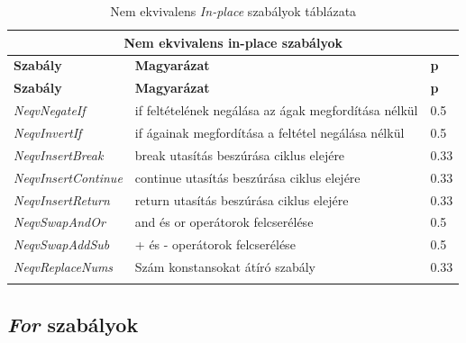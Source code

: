 \begin{center}
	\begin{longtable}{ | p{} | p{} | p{} | }
		\hline
		\multicolumn{3}{|c|}{\textbf{Nem ekvivalens in-place szabályok}}
		\\ \hline
		
		\textbf{Szabály} & \textbf{Magyarázat} & \textbf{p}
		\\ \hline \hline
		\endfirsthead %
		
		\hline
		\textbf{Szabály} & \textbf{Magyarázat} & \textbf{p}
		\\ \hline \hline
		\endhead %
		
		\hline
		\endfoot %
		
		\endlastfoot %
		
		\emph{NeqvNegateIf}
		& if feltételének negálása az ágak megfordítása nélkül
		& 0.5
		\\ \hline

		\emph{NeqvInvertIf}
		& if ágainak megfordítása a feltétel negálása nélkül
		& 0.5
		\\ \hline

		\emph{NeqvInsertBreak}
		& break utasítás beszúrása ciklus elejére
		& 0.33
		\\ \hline

		\emph{NeqvInsertContinue}
		& continue utasítás beszúrása ciklus elejére
		& 0.33
		\\ \hline

		\emph{NeqvInsertReturn}
		& return utasítás beszúrása ciklus elejére
		& 0.33
		\\ \hline
		
		\emph{NeqvSwapAndOr}
		& and és or operátorok felcserélése
		& 0.5
		\\ \hline

		\emph{NeqvSwapAddSub}
		& + és - operátorok felcserélése
		& 0.5
		\\ \hline

		\emph{NeqvReplaceNums}
		& Szám konstansokat átíró szabály
		& 0.33
		\\ \hline

		\caption{Nem ekvivalens \emph{In-place} szabályok táblázata}
		\label{tab:in-place-rules-neqv}
	\end{longtable}
\end{center}

\subsection{\emph{For} szabályok}


